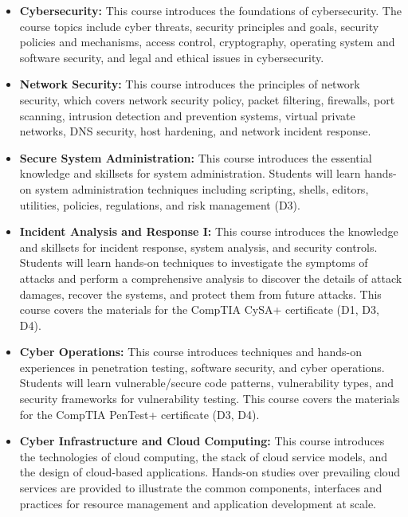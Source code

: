 \documentclass{article}
\begin{document}
\begin{itemize}

    \item \textbf{Cybersecurity:}
This course introduces the foundations of cybersecurity. The course topics include cyber threats, security principles and goals, security policies and mechanisms, access control, cryptography, operating system and software security, and legal and ethical issues in cybersecurity. 

    \item \textbf{Network Security:}
This course introduces the principles of network security, which covers network security policy, packet filtering, firewalls, port scanning, intrusion detection and prevention systems, virtual private networks, DNS security, host hardening, and network incident response.

    \item \textbf{Secure System Administration:}
This course introduces the essential knowledge and skillsets for system administration. Students will learn  hands-on system administration techniques including scripting, shells, editors, utilities, policies, regulations, and risk management (D3). 

    \item \textbf{Incident Analysis and Response I:}
This course introduces the knowledge and skillsets for incident response, system analysis, and security controls. Students will learn hands-on techniques to investigate the symptoms of attacks and perform a comprehensive analysis to discover the details of attack damages,  recover the systems, and protect them from future attacks. 
This course covers the materials for the CompTIA CySA+ certificate (D1, D3, D4).

    \item \textbf{Cyber Operations:}
This course introduces  techniques and hands-on experiences in penetration testing, software security, and cyber operations. Students will learn vulnerable/secure code patterns, vulnerability types, and security frameworks for vulnerability testing. This course covers the materials for the CompTIA PenTest+ certificate (D3, D4).

    \item \textbf{Cyber Infrastructure and  Cloud Computing:}
This course introduces the technologies of cloud computing, the stack of cloud service models, and the design of cloud-based applications. Hands-on studies over prevailing cloud services are provided to illustrate the common components, interfaces and practices for resource management and application development at scale.

\end{itemize}
\end{document}
